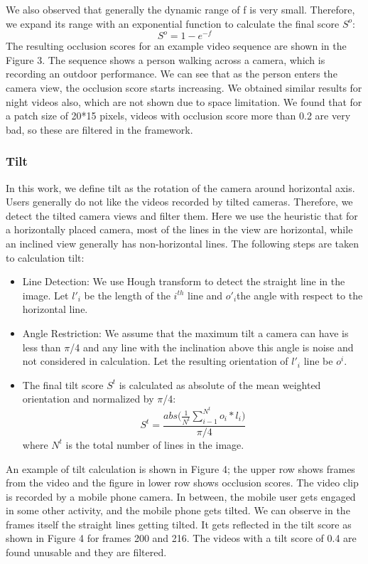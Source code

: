 \documentclass{sig-alternate}
\begin{document}
We also observed that generally the dynamic range of f is very small. Therefore, we expand its range with an exponential function to calculate the final score $S^o$:
\[
  S^o = 1 - e^{-f}
\]
The resulting occlusion scores for an example video sequence are shown in the Figure 3. The sequence shows a person walking across a camera, which is recording an outdoor performance. We
can see that as the person enters the camera view, the occlusion score starts increasing. We obtained similar results for night videos also, which are not shown due to space limitation. We found that for a patch size of 20*15 pixels, videos with occlusion score more than 0.2 are very bad, so these are filtered in the framework.
\subsubsection{Tilt}
In this work, we define tilt as the rotation of the camera around horizontal axis. User\textquotesingle s generally do not like the videos recorded by tilted cameras. Therefore, we detect the tilted camera views and filter them. Here we use the heuristic that for a horizontally placed camera, most of the lines in the view are horizontal, while an inclined view generally has non-horizontal lines. The following steps are taken to calculation tilt:
\begin{itemize}
    \item Line Detection: We use Hough transform to detect the straight line in the image. Let ${l'}_i$ be the length of the $i^{th}$ line and ${o'}_i$the angle with respect to the horizontal line.
    \item Angle Restriction: We assume that the maximum tilt a camera can have is less than $\pi$/4 and any line with the inclination above this angle is noise and not considered in calculation. Let the resulting orientation of ${l'}_i$ line be ${o}^i$.
    \item The final tilt score $S^t$ is calculated as absolute of the mean weighted orientation and normalized by $\pi$/4:
    \[
      S^t = \frac{abs\big(\frac{1}{N^t}\sum_{i-1}^{N^t}o_i*l_i\big)}{\pi/4}
    \]
    where $N^t$ is the total number of lines in the image.
\end{itemize}
An example of tilt calculation is shown in Figure 4; the upper row shows frames from the video and the figure in lower row shows occlusion scores. The video clip is recorded by a mobile phone
camera. In between, the mobile user gets engaged in some other activity, and the mobile phone gets tilted. We can observe in the frames itself the straight lines getting tilted. It gets reflected in the tilt score as shown in Figure 4 for frames 200 and 216. The videos with a tilt score of 0.4 are found unusable and they are filtered.
\end{document}
